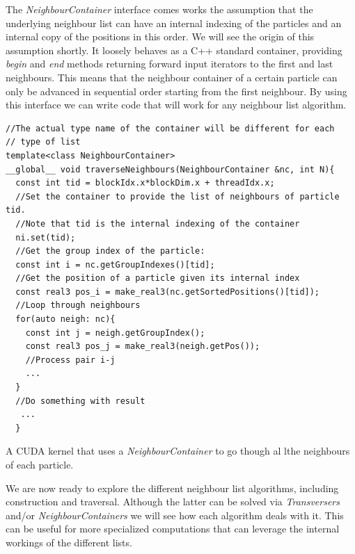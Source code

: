 \documentclass[ twoside,openright,titlepage,numbers=noenddot,%
headinclude,footinclude,cleardoublepage=empty,abstract=on,
BCOR=5mm,paper=a4,fontsize=11pt, dvipsnames
]{scrreprt}
\def\ucpp{uammd_cpp_lexer.py:UAMMDCppLexer -x}
\begin{document}
The \emph{NeighbourContainer} interface comes works the assumption that the underlying neighbour list can have an internal indexing of the particles and an internal copy of the positions in this order. We will see the origin of this assumption shortly.
It loosely behaves as a C++ standard container, providing \emph{begin} and \emph{end} methods returning forward input iterators to the first and last neighbours. This means that the neighbour container of a certain particle can only be advanced in sequential order starting from the first neighbour.
By using this interface we can write code that will work for any neighbour list algorithm.

\begin{listing}
\begin{verbatim}
//The actual type name of the container will be different for each
// type of list
template<class NeighbourContainer>
__global__ void traverseNeighbours(NeighbourContainer &nc, int N){
  const int tid = blockIdx.x*blockDim.x + threadIdx.x;
  //Set the container to provide the list of neighbours of particle tid.
  //Note that tid is the internal indexing of the container
  ni.set(tid);
  //Get the group index of the particle:
  const int i = nc.getGroupIndexes()[tid];
  //Get the position of a particle given its internal index
  const real3 pos_i = make_real3(nc.getSortedPositions()[tid]);  
  //Loop through neighbours
  for(auto neigh: nc){
    const int j = neigh.getGroupIndex();
    const real3 pos_j = make_real3(neigh.getPos());
    //Process pair i-j
    ...
  }
  //Do something with result
   ...
  }
\end{verbatim}
\caption{A CUDA kernel that uses a \emph{NeighbourContainer} to go though al lthe neighbours of each particle.}
\label{code:ncontainer}
\end{listing}

We are now ready to explore the different neighbour list algorithms, including construction and traversal. Although the latter can be solved via \emph{Transversers} and/or \emph{NeighbourContainers} we will see how each algorithm deals with it. This can be useful for more specialized computations that can leverage the internal workings of the different lists.
\end{document}
